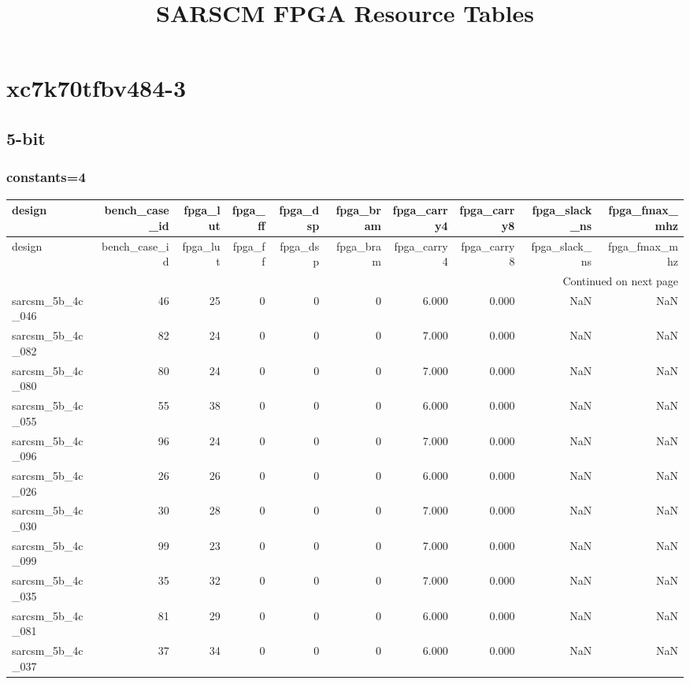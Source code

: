 \documentclass{article}
\begin{document}
\title{SARSCM FPGA Resource Tables}
\date{}
\maketitle
\section*{xc7k70tfbv484-3}
\subsection*{5-bit}
\subsubsection*{constants=4}
\begin{longtable}{lrrrrrrrrr}
\toprule
design & bench\_case\_id & fpga\_lut & fpga\_ff & fpga\_dsp & fpga\_bram & fpga\_carry4 & fpga\_carry8 & fpga\_slack\_ns & fpga\_fmax\_mhz \\
\midrule
\endfirsthead
\toprule
design & bench\_case\_id & fpga\_lut & fpga\_ff & fpga\_dsp & fpga\_bram & fpga\_carry4 & fpga\_carry8 & fpga\_slack\_ns & fpga\_fmax\_mhz \\
\midrule
\endhead
\midrule
\multicolumn{10}{r}{Continued on next page} \\
\midrule
\endfoot
\bottomrule
\endlastfoot
sarcsm\_5b\_4c\_046 & 46 & 25 & 0 & 0 & 0 & 6.000 & 0.000 & NaN & NaN \\
sarcsm\_5b\_4c\_082 & 82 & 24 & 0 & 0 & 0 & 7.000 & 0.000 & NaN & NaN \\
sarcsm\_5b\_4c\_080 & 80 & 24 & 0 & 0 & 0 & 7.000 & 0.000 & NaN & NaN \\
sarcsm\_5b\_4c\_055 & 55 & 38 & 0 & 0 & 0 & 6.000 & 0.000 & NaN & NaN \\
sarcsm\_5b\_4c\_096 & 96 & 24 & 0 & 0 & 0 & 7.000 & 0.000 & NaN & NaN \\
sarcsm\_5b\_4c\_026 & 26 & 26 & 0 & 0 & 0 & 6.000 & 0.000 & NaN & NaN \\
sarcsm\_5b\_4c\_030 & 30 & 28 & 0 & 0 & 0 & 7.000 & 0.000 & NaN & NaN \\
sarcsm\_5b\_4c\_099 & 99 & 23 & 0 & 0 & 0 & 7.000 & 0.000 & NaN & NaN \\
sarcsm\_5b\_4c\_035 & 35 & 32 & 0 & 0 & 0 & 7.000 & 0.000 & NaN & NaN \\
sarcsm\_5b\_4c\_081 & 81 & 29 & 0 & 0 & 0 & 6.000 & 0.000 & NaN & NaN \\
sarcsm\_5b\_4c\_037 & 37 & 34 & 0 & 0 & 0 & 6.000 & 0.000 & NaN & NaN \\

\end{longtable}
\end{document}
